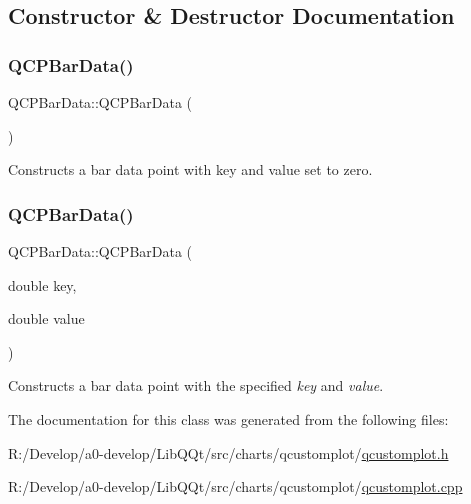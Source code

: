 \subsection{Constructor \& Destructor Documentation}
\mbox{\label{class_q_c_p_bar_data_a8d214eda9ef41bc6da2a908a09623836}} 
\subsubsection{\texorpdfstring{Q\+C\+P\+Bar\+Data()}{QCPBarData()}\hspace{0.1cm}{\footnotesize\ttfamily [1/2]}}
{\footnotesize\ttfamily Q\+C\+P\+Bar\+Data\+::\+Q\+C\+P\+Bar\+Data (\begin{DoxyParamCaption}{ }\end{DoxyParamCaption})}

Constructs a bar data point with key and value set to zero. \mbox{\label{class_q_c_p_bar_data_ac0bb7ede5373a7b18713418fa78f972d}} 
\subsubsection{\texorpdfstring{Q\+C\+P\+Bar\+Data()}{QCPBarData()}\hspace{0.1cm}{\footnotesize\ttfamily [2/2]}}
{\footnotesize\ttfamily Q\+C\+P\+Bar\+Data\+::\+Q\+C\+P\+Bar\+Data (\begin{DoxyParamCaption}\item[{double}]{key,  }\item[{double}]{value }\end{DoxyParamCaption})}

Constructs a bar data point with the specified {\itshape key} and {\itshape value}. 

The documentation for this class was generated from the following files\+:\begin{DoxyCompactItemize}
\item 
R\+:/\+Develop/a0-\/develop/\+Lib\+Q\+Qt/src/charts/qcustomplot/\mbox{\hyperlink{qcustomplot_8h}{qcustomplot.\+h}}\item 
R\+:/\+Develop/a0-\/develop/\+Lib\+Q\+Qt/src/charts/qcustomplot/\mbox{\hyperlink{qcustomplot_8cpp}{qcustomplot.\+cpp}}\end{DoxyCompactItemize}
